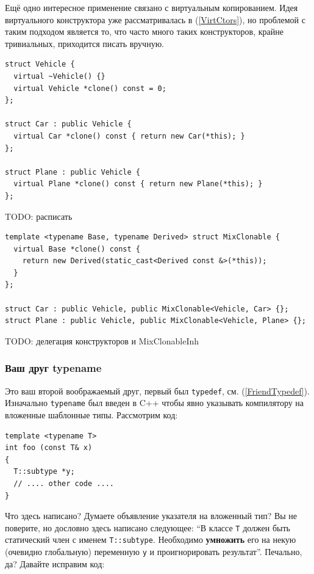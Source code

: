 \documentclass[a4paper,12pt,oneside]{article}
\begin{document}
Ещё одно интересное применение связано с виртуальным копированием. Идея виртуального конструктора уже рассматривалась в (\ref{VirtCtors}), но проблемой с таким подходом является то, что часто много таких конструкторов, крайне тривиальных, приходится писать вручную.

\begin{lstlisting}
struct Vehicle {
  virtual ~Vehicle() {}
  virtual Vehicle *clone() const = 0;
};

struct Car : public Vehicle {
  virtual Car *clone() const { return new Car(*this); }
}; 

struct Plane : public Vehicle {
  virtual Plane *clone() const { return new Plane(*this); }
};
\end{lstlisting}

TODO: расписать 

\begin{lstlisting}
template <typename Base, typename Derived> struct MixClonable {
  virtual Base *clone() const {
    return new Derived(static_cast<Derived const &>(*this));
  }
};

struct Car : public Vehicle, public MixClonable<Vehicle, Car> {}; 
struct Plane : public Vehicle, public MixClonable<Vehicle, Plane> {};
\end{lstlisting}

TODO: делегация конструкторов и MixClonableInh

\subsubsection{Ваш друг typename}\label{FriendTypename}

Это ваш второй воображаемый друг, первый был \lstinline!typedef!, см. (\ref{FriendTypedef}). Изначально \lstinline!typename! был введен в C++ чтобы явно указывать компилятору на вложенные шаблонные типы. Рассмотрим код:

\begin{lstlisting}
template <typename T>
int foo (const T& x)
{
  T::subtype *y;
  // .... other code ....
}
\end{lstlisting}

Что здесь написано? Думаете объявление указателя на вложенный тип? Вы не поверите, но дословно здесь написано 
следующее: ``В классе \lstinline!T! должен быть статический член с именем \lstinline!T::subtype!. Необходимо \textbf{умножить} его на некую (очевидно глобальную) переменную \lstinline!y! и проигнорировать результат''. Печально, да? Давайте исправим код:
\end{document}
